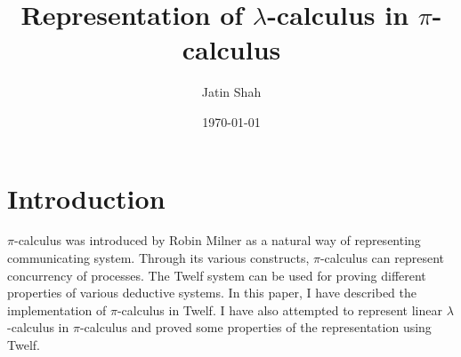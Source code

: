 \documentclass[12pt]{article}
\title{Representation of $\lambda$-calculus in $\pi$-calculus}
\author{Jatin Shah}
\date{\today}
\begin{document}
\maketitle
\section{Introduction}
$\pi$-calculus was introduced by Robin Milner \cite{PiCalc} as a natural way of representing communicating system. Through its various constructs, $\pi$-calculus can represent concurrency of processes. The Twelf \cite{Twelf} system can be used for proving different properties of various deductive systems. In this paper, I have described the implementation of $\pi$-calculus in Twelf. I have also attempted to represent linear $\lambda$-calculus in $\pi$-calculus and proved some properties of the representation using Twelf.
\end{document}

